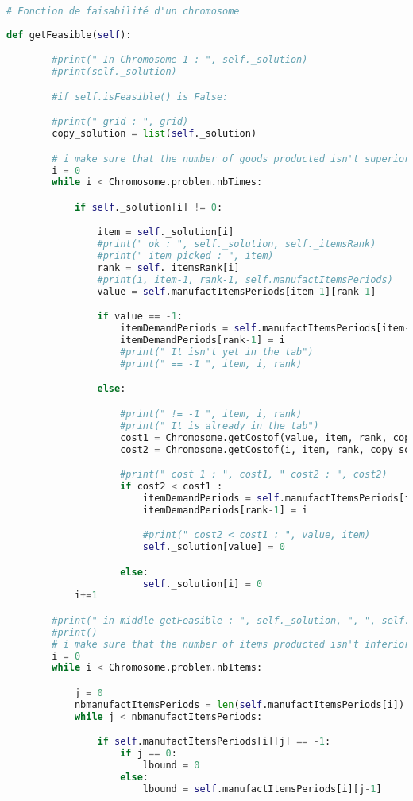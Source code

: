 		\begin{lstlisting}[language=python]
		# Fonction de faisabilité d'un chromosome
		
def getFeasible(self):

		#print(" In Chromosome 1 : ", self._solution)
		#print(self._solution)

		#if self.isFeasible() is False:

		#print(" grid : ", grid)
		copy_solution = list(self._solution)

		# i make sure that the number of goods producted isn't superior to the number expected
		i = 0
		while i < Chromosome.problem.nbTimes:

			if self._solution[i] != 0:

				item = self._solution[i]
				#print(" ok : ", self._solution, self._itemsRank)
				#print(" item picked : ", item)
				rank = self._itemsRank[i]
				#print(i, item-1, rank-1, self.manufactItemsPeriods)
				value = self.manufactItemsPeriods[item-1][rank-1]

				if value == -1:
					itemDemandPeriods = self.manufactItemsPeriods[item-1]
					itemDemandPeriods[rank-1] = i
					#print(" It isn't yet in the tab")
					#print(" == -1 ", item, i, rank)

				else:

					#print(" != -1 ", item, i, rank)
					#print(" It is already in the tab")
					cost1 = Chromosome.getCostof(value, item, rank, copy_solution, i)
					cost2 = Chromosome.getCostof(i, item, rank, copy_solution, value)

					#print(" cost 1 : ", cost1, " cost2 : ", cost2)
					if cost2 < cost1 :
						itemDemandPeriods = self.manufactItemsPeriods[item-1]
						itemDemandPeriods[rank-1] = i

						#print(" cost2 < cost1 : ", value, item)
						self._solution[value] = 0

					else:
						self._solution[i] = 0
			i+=1

		#print(" in middle getFeasible : ", self._solution, ", ", self._itemsRank)
		#print()
		# i make sure that the number of items producted isn't inferior to the number expected
		i = 0
		while i < Chromosome.problem.nbItems:

			j = 0
			nbmanufactItemsPeriods = len(self.manufactItemsPeriods[i])
			while j < nbmanufactItemsPeriods:

				if self.manufactItemsPeriods[i][j] == -1:
					if j == 0:
						lbound = 0
					else:
						lbound = self.manufactItemsPeriods[i][j-1]
					

\end{lstlisting}
